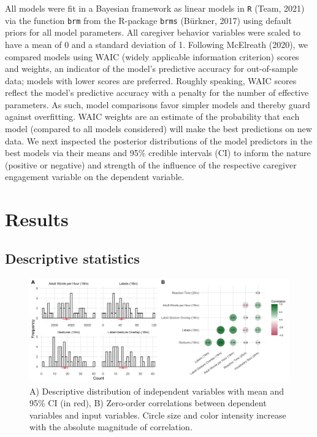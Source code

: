 \documentclass[
  man,mask,floatsintext]{apa6}
\begin{document}
All models were fit in a Bayesian framework as linear models in \texttt{R} (Team, 2021) via the function \texttt{brm} from the R-package \texttt{brms} (Bürkner, 2017) using default priors for all model parameters. All caregiver behavior variables were scaled to have a mean of 0 and a standard deviation of 1. Following McElreath (2020), we compared models using WAIC (widely applicable information criterion) scores and weights, an indicator of the model's predictive accuracy for out-of-sample data; models with lower scores are preferred. Roughly speaking, WAIC scores reflect the model's predictive accuracy with a penalty for the number of effective parameters. As such, model comparisons favor simpler models and thereby guard against overfitting. WAIC weights are an estimate of the probability that each model (compared to all models considered) will make the best predictions on new data. We next inspected the posterior distributions of the model predictors in the best models via their means and 95\% credible intervals (CI) to inform the nature (positive or negative) and strength of the influence of the respective caregiver engagement variable on the dependent variable.

\hypertarget{results}{%
\section{Results}\label{results}}

\hypertarget{descriptive-statistics}{%
\subsection{Descriptive statistics}\label{descriptive-statistics}}

\begin{figure}
\includegraphics[width=1\linewidth]{../stats/figures/fig.1ab} \caption{A) Descriptive distribution of independent variables with mean and 95\% CI (in red), B) Zero-order correlations between dependent variables and input variables. Circle size and color intensity increase with the absolute magnitude of correlation.}\label{fig:fig2}
\end{figure}
\end{document}
